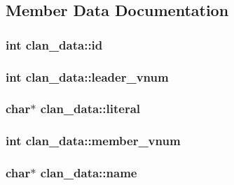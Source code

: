 \subsection{Member Data Documentation}
\hypertarget{structclan__data_a893475695eea4959052449783d2365cf}{
\subsubsection[{id}]{\setlength{\rightskip}{0pt plus 5cm}int clan\-\_\-data\-::id}}\label{structclan__data_a893475695eea4959052449783d2365cf}
\hypertarget{structclan__data_af548b9a27c379c410a43808c846f959a}{
\subsubsection[{leader\-\_\-vnum}]{\setlength{\rightskip}{0pt plus 5cm}int clan\-\_\-data\-::leader\-\_\-vnum}}\label{structclan__data_af548b9a27c379c410a43808c846f959a}
\hypertarget{structclan__data_a66471538c5978cdb076e6fe5eb7e2bfd}{
\subsubsection[{literal}]{\setlength{\rightskip}{0pt plus 5cm}char$\ast$ clan\-\_\-data\-::literal}}\label{structclan__data_a66471538c5978cdb076e6fe5eb7e2bfd}
\hypertarget{structclan__data_aad70d793cc6fab90c51c7882e39ba00b}{
\subsubsection[{member\-\_\-vnum}]{\setlength{\rightskip}{0pt plus 5cm}int clan\-\_\-data\-::member\-\_\-vnum}}\label{structclan__data_aad70d793cc6fab90c51c7882e39ba00b}
\hypertarget{structclan__data_ab1a1db6e6b58d24b2aa0916a177ef706}{
\subsubsection[{name}]{\setlength{\rightskip}{0pt plus 5cm}char$\ast$ clan\-\_\-data\-::name}}\label{structclan__data_ab1a1db6e6b58d24b2aa0916a177ef706}
